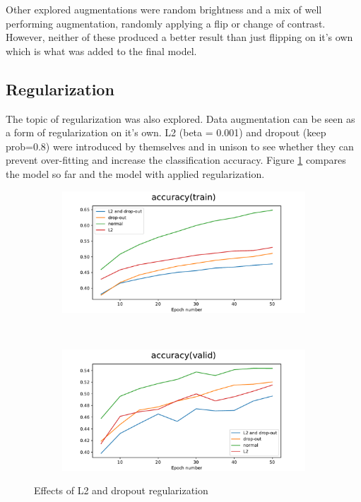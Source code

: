 \documentclass[12pt]{article}
\begin{document}
Other explored augmentations were random brightness and a mix of well performing augmentation, randomly applying a flip or change of contrast. However, neither of these produced a better result than just flipping on it's own which is what was added to the final model.

\subsection*{Regularization}

The topic of regularization was also explored. Data augmentation can be seen as a form of regularization on it's own. L2 (beta = 0.001) and dropout (keep prob=0.8) were introduced by themselves and in unison to see whether they can prevent over-fitting and increase the classification accuracy. Figure \ref{fig:reg} compares the model so far and the model with applied regularization.

\begin{figure}[ht!]
    \centering
    \begin{subfigure}[t]{0.475\textwidth}
        \centering
        \includegraphics[width=1.0\linewidth]{hidden_units_layers_4_flip_reg_accuracy(train).pdf}
    \end{subfigure}%
    ~ 
    \begin{subfigure}[t]{0.475\textwidth}
        \centering
        \includegraphics[width=1.0\linewidth]{hidden_units_layers_4_flip_reg_accuracy(valid).pdf}
    \end{subfigure}
   \caption{Effects of L2 and dropout regularization }
    \label{fig:reg}
\end{figure}
\end{document}
